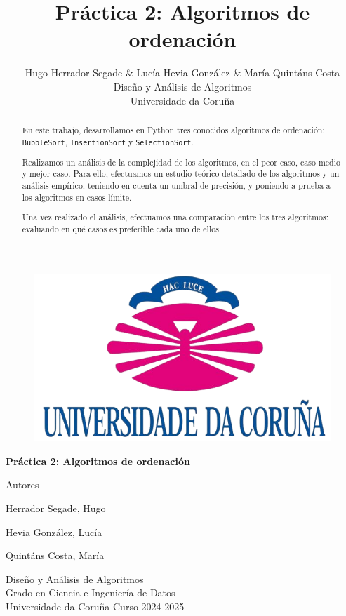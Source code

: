 \documentclass[a4paper, titlepage]{article}
\title{Práctica 2: Algoritmos de ordenación}
\author{Hugo Herrador Segade \& Lucía Hevia González \& María Quintáns Costa\\
  \small Diseño y Análisis de Algoritmos\\
  \small Universidade da Coruña
}
\begin{document}
\begin{titlepage}

\centering
\begin{figure}
\centering
\includegraphics[scale = 0.2]{logos.png}
\end{figure}

\normalsize {}
\hspace{50mm}

\vspace{5cm}

\Huge
\textbf{Práctica 2: Algoritmos de ordenación} 
\vfill
{\Large Autores \par}

\huge {Herrador Segade, Hugo}

\huge{Hevia González, Lucía}

\huge{Quintáns Costa, María}

\vfill
\vfill
\vfill
\vfill
\large {Diseño y Análisis de Algoritmos} \\
\large {Grado en Ciencia e Ingeniería de Datos} \\
\large {Universidade da Coruña}
\vfill
{\large Curso 2024-2025}

\clearpage 
\vfill
\end{titlepage}


\begin{abstract}

En este trabajo, desarrollamos en Python tres conocidos algoritmos de ordenación: \texttt{BubbleSort}, \texttt{InsertionSort} y \texttt{SelectionSort}.

Realizamos un análisis de la complejidad de los algoritmos, en el peor caso, caso medio y mejor caso. Para ello, efectuamos un estudio teórico detallado de los algoritmos y un análisis empírico, teniendo en cuenta un umbral de precisión, y poniendo a prueba a los algoritmos en casos límite.

Una vez realizado el análisis, efectuamos una comparación entre los tres algoritmos: evaluando en qué casos es preferible cada uno de ellos.
\vfill \end{abstract}
\end{document}
